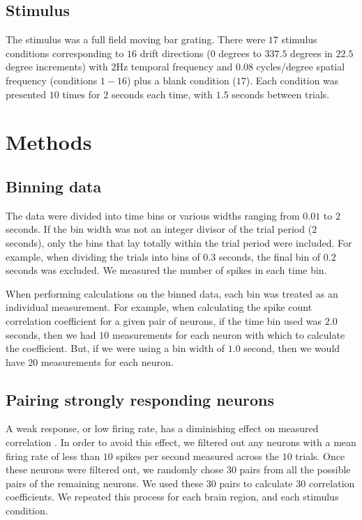 \documentclass[a4paper,12pt]{article}
\theoremstyle{definition}
\begin{document}
\subsection{Stimulus}

The stimulus was a full field moving bar grating. There were $17$ stimulus conditions corresponding to $16$ drift directions ($0$ degrees to $337.5$ degrees in $22.5$ degree increments) with $2$Hz temporal frequency and $0.08$ cycles/degree spatial frequency (conditions $1-16$) plus a blank condition ($17$). Each condition was presented $10$ times for $2$ seconds each time, with $1.5$ seconds between trials.

\section{Methods}
\subsection{Binning data}
The data were divided into time bins or various widths ranging from $0.01$ to $2$ seconds. If the bin width was not an integer divisor of the trial period ($2$ seconds), only the bins that lay totally within the trial period were included. For example, when dividing the trials into bins of $0.3$ seconds, the final bin of $0.2$ seconds was excluded. We measured the number of spikes in each time bin.

When performing calculations on the binned data, each bin was treated as an individual measurement. For example, when calculating the spike count correlation coefficient for a given pair of neurons, if the time bin used was $2.0$ seconds, then we had $10$ measurements for each neuron with which to calculate the coefficient. But, if we were using a bin width of $1.0$ second, then we would have $20$ measurements for each neuron.

\subsection{Pairing strongly responding neurons}
A weak response, or low firing rate, has a diminishing effect on measured correlation \cite{cohen}. In order to avoid this effect, we filtered out any neurons with a mean firing rate of less than $10$ spikes per second measured across the $10$ trials. Once these neurons were filtered out, we randomly chose $30$ pairs from all the possible pairs of the remaining neurons. We used these $30$ pairs to calculate $30$ correlation coefficients. We repeated this process for each brain region, and each stimulus condition.
\end{document}

